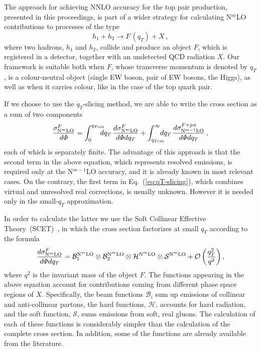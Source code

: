 \documentclass{PoS}
\newcommand{\calB}{\mathcal B}
\newcommand{\calS}{\mathcal S}
\newcommand{\calH}{\mathcal H}
\newcommand{\order}[1]{{{\cal O}\left(#1\right)}}
\begin{document}
The approach for achieving NNLO accuracy for the top pair production,
presented in this proceedings, is part of a wider strategy for calculating
N$^m$LO contributions to processes of the type
%
\begin{equation}
  h_1 + h_2 \to F\, {\textstyle (q_T)} + X\,,
\end{equation}
%
where two hadrons, $h_1$ and $h_2$, collide and produce an object $F$, which is
registered in a detector, together with an undetected QCD radiation $X$. 
%
Our framework is suitable both when $F$, whose transverse momentum is denoted by
$q_T$, is a colour-neutral object (single EW boson, pair of EW bosons, the
Higgs), as well as when it carries colour, like in the case of the top quark
pair. 

If we choose to use the $q_T$-slicing method, we are able to write the cross
section as
a sum of two components~\cite{Catani:2007vq, Bonciani:2015sha}
%
\begin{equation}
  \frac{\sigma_{{\rm N}^m{\rm LO}}^{F}}{d\Phi} = 
  \int^{q_{T{\rm cut}}}_0 
  \!\!\!\!\! d q_T\,
  \frac{d\sigma^{F}_{{\rm N}^m{\rm LO}}}{d\Phi dq_T} +
  \int_{q_{T{\rm cut}}}^\infty 
  \!\!\!\!\! d q_T\,
  \frac{d\sigma^{F + {\rm jet}}_{{\rm N}^{m-1}{\rm LO}}}{d\Phi dq_T}\,,
  \label{eq:qT-slicing}
\end{equation}
%
each of which is separately finite.
%
The advantage of this approach is that the second term in the above equation,
which represents resolved emissions, is required only at the N$^{m-1}$LO
accuracy, and it is already known in most relevant cases.  
%
On the contrary, the first term in Eq.~(\ref{eq:qT-slicing}), which combines
virtual and unresolved real corrections, is usually unknown. However it is
needed only in the small-$q_T$ approximation.

In order to calculate the latter we use the Soft Collinear Effective
Theory~(SCET)~\cite{Becher:2014oda}, in which the cross section factorizes at
small $q_T$ according to the formula
%
\begin{equation}
  \frac{d\sigma^F_{{\rm N}^m{\rm LO}}}{d\Phi dq_T} = 
  \calB_1^{{\rm N}^m{\rm LO}}\otimes
  \calB_2^{{\rm N}^m{\rm LO}}\otimes
  \calH^{{\rm N}^m{\rm LO}}\otimes
  \calS^{{\rm N}^m{\rm LO}} +
  \order{\frac{q_T^2}{q^2}} \,,
  \label{eq:smallqT-cs}
\end{equation}
%
where $q^2$ is the invariant mass of the object $F$.
%
The functions appearing in the above equation account for contributions coming
from different phase space regions of $X$. Specifically, the beam functions
$\calB_i$ sum up emissions of collinear and anti-collinear partons, the hard
functions, $\calH$, accounts for hard radiation, and the soft function, $\calS$,
sums emissions from soft, real gluons.
%
The calculation of each of these functions is considerably simpler than the
calculation of the complete cross section. In addition, some of the functions
are already available from the literature.
\end{document}

